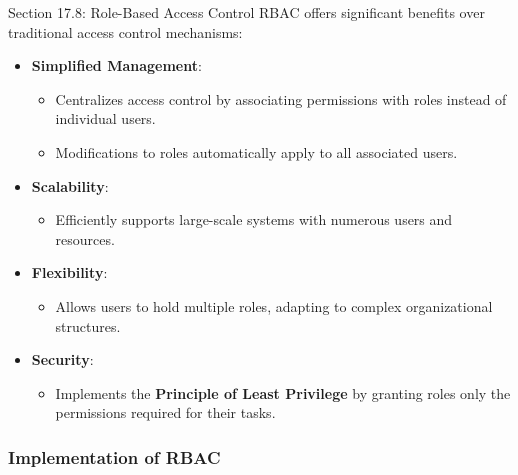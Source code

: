 \begin{notes}{Section 17.8: Role-Based Access Control}
    RBAC offers significant benefits over traditional access control mechanisms:
    \begin{itemize}
        \item \textbf{Simplified Management}:
        \begin{itemize}
            \item Centralizes access control by associating permissions with roles instead of individual users.
            \item Modifications to roles automatically apply to all associated users.
        \end{itemize}
        \item \textbf{Scalability}:
        \begin{itemize}
            \item Efficiently supports large-scale systems with numerous users and resources.
        \end{itemize}
        \item \textbf{Flexibility}:
        \begin{itemize}
            \item Allows users to hold multiple roles, adapting to complex organizational structures.
        \end{itemize}
        \item \textbf{Security}:
        \begin{itemize}
            \item Implements the \textbf{Principle of Least Privilege} by granting roles only the permissions required for their tasks.
        \end{itemize}
    \end{itemize}
    
    \subsubsection*{Implementation of RBAC}
    

\end{notes}

